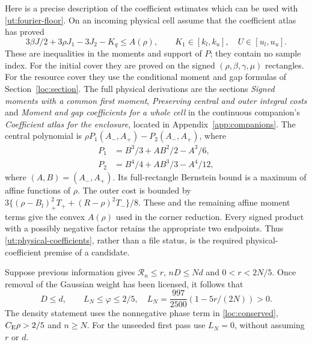 Here is a precise description of the coefficient estimates which can
be used with \eqref{ut:fourier-floor}. On an incoming physical cell
assume that the coefficient atlas has proved
\begin{equation}\label{ut:physical-coefficients}
 3\beta J/2+3\rho J_1-3J_2-K_q\le A(\rho),\qquad
 K_1\in[k_l,k_u],\quad U\in[u_l,u_u].
\end{equation}
These are inequalities in the moments and support of $P$; they contain
no sample index. For the initial cover they are proved on the signed
$(\rho,\beta,\gamma,\mu)$ rectangles. For the resource cover they use
the conditional moment and gap formulas of Section~\ref{loc:section}.
The full physical derivations are the sections \emph{Signed moments
with a common first moment}, \emph{Preserving central and outer
integral costs} and \emph{Moment and gap coefficients for a whole
cell} in the continuous companion's \emph{Coefficient atlas for the
enclosure}, located in Appendix~\ref{app:companions}.
The central polynomial is $\rho P_1(A_-,A_+)-P_2(A_-,A_+)$, where
\begin{align*}
 P_1&=B^3/3+AB^2/2-A^3/6,\\
 P_2&=B^4/4+AB^3/3-A^4/12,
\end{align*}
where $(A,B)=(A_-,A_+)$.
Its full-rectangle Bernstein bound is a maximum of affine functions
of $\rho$. The outer cost is bounded by
$3\{(\rho-B_l)_+^2T_++(R-\rho)^2T_-\}/8$.
These and the remaining affine moment terms give the convex
$A(\rho)$ used in the corner reduction. Every signed product with
a possibly negative factor retains the appropriate two endpoints.
Thus \eqref{ut:physical-coefficients}, rather than a file status, is
the required physical-coefficient premise of a candidate.

Suppose previous information gives
$\mathcal R_n\le r$, $nD\le Nd$ and $0<r<2N/5$.
Once removal of the Gaussian weight has been licensed, it follows that
\begin{equation}\label{ut:incoming-envelope}
 D\le d,\qquad L_N\le\varphi\le2/5,\quad
 L_N=\frac{997}{2500}(1-5r/(2N))>0.
\end{equation}
The density statement uses the nonnegative phase term in
\eqref{loc:conserved}, $C_{\mathrm E}\rho>2/5$ and $n\ge N$.
For the unseeded first pass use $L_N=0$, without assuming $r$ or $d$.

